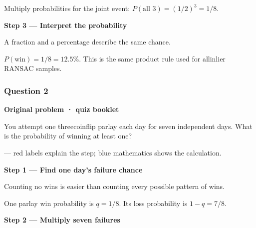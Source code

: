 \documentclass[letterpaper,11pt,english,openany,oneside]{jupyterBook}
\begin{document}
\sphinxAtStartPar
Multiply probabilities for the joint event: {\color{QuizMathBlue} \(P(\text{all 3})=(1/2)^3=1/8\)}.

\par

\par\medskip{}
{\color{QuizStepRed}\bfseries Step 3 — Interpret the probability}\par\smallskip

\sphinxAtStartPar
{} A fraction and a percentage describe the same chance.

\sphinxAtStartPar
{\color{QuizMathBlue} \(\boxed{P(\text{win})=1/8=12.5\%}\)}. This is the same product rule used for all\sphinxhyphen{}inlier RANSAC samples.

\par


\subsubsection{Question 2}
\label{\detokenize{lectures/lecture01/quiz-workbook:question-2}}\label{\detokenize{lectures/lecture01/quiz-workbook:quiz-17-q2}}
\par\medskip\textbf{Original problem · quiz booklet}\par\smallskip

\sphinxAtStartPar
You attempt one three\sphinxhyphen{}coin\sphinxhyphen{}flip parlay each day for seven independent days. What is the probability of winning at least one?

\par\medskip

\sphinxAtStartPar
{} — red labels explain the step; blue mathematics shows the calculation.

\par\medskip{}
{\color{QuizStepRed}\bfseries Step 1 — Find one day's failure chance}\par\smallskip

\sphinxAtStartPar
{} Counting no wins is easier than counting every possible pattern of wins.

\sphinxAtStartPar
One parlay win probability is {\color{QuizMathBlue} \(q=1/8\)}. Its loss probability is {\color{QuizMathBlue} \(1-q=7/8\)}.

\par

\par\medskip{}
{\color{QuizStepRed}\bfseries Step 2 — Multiply seven failures}\par\smallskip
\end{document}
